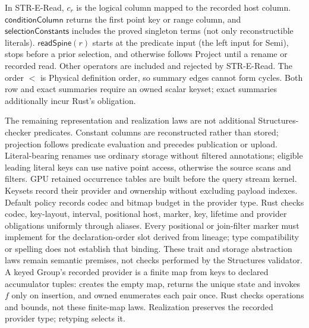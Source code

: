 In STR-E-Read, $c_r$ is the logical column mapped to the recorded host
column. $\mathsf{conditionColumn}$ returns the first point key or range
column, and $\mathsf{selectionConstants}$ includes the proved singleton
terms (not only reconstructible literals).
$\mathsf{readSpine}(r)$ starts at the predicate input (the left input for
Semi), stops before a prior selection, and otherwise follows Project until
a rename or recorded read. Other operators are included and rejected by
STR-E-Read. The order $<$ is Physical definition order, so summary edges
cannot form cycles. Both row and exact summaries require an owned scalar
keyset; exact summaries additionally incur Rust's
 obligation.

The remaining representation and realization laws are not additional
Structures-checker predicates. Constant columns are reconstructed rather
than stored; projection follows predicate evaluation and precedes publication
or upload. Literal-bearing renames use ordinary storage without filtered
annotations; eligible leading literal keys can use native point access,
otherwise the source scans and filters. GPU retained occurrence tables are
built before the query stream kernel.
Keysets record their provider and ownership without excluding payload indexes.
Default policy records codec and bitmap budget in the provider type.
Rust checks codec, key-layout, interval, positional host, marker, key,
lifetime and provider obligations uniformly through aliases. Every positional
or join-filter marker must implement  for the
declaration-order slot derived from lineage; type compatibility or spelling
does not establish that binding. These trait and storage abstraction laws
remain semantic premises, not checks performed by the Structures validator.
A keyed Group's recorded provider is a finite map from keys to declared
accumulator tuples:  creates the empty map,
 returns the unique state and invokes $f$
only on insertion, and owned  enumerates each pair once.
Rust checks operations and bounds, not these finite-map laws. Realization
preserves the recorded provider type;  retyping selects it.

